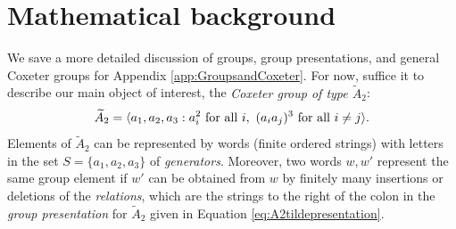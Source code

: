 \documentclass{article}
\begin{document}


\section{Mathematical background}\label{sec:math-background}

We save a more detailed discussion of groups, group presentations, and general Coxeter groups for Appendix \ref{app:GroupsandCoxeter}. For now, suffice it to describe our main object of interest, the \textit{Coxeter group of type $\widetilde{A}_2$}:
\begin{equation}
\label{eq:A2tildepresentation}
\widetilde{A}_2 = \langle a_1, a_2, a_3 : a_i^2 \textup{ for all } i, \,\, (a_ia_j)^3 \textup{ for all } i\neq j\rangle.
\end{equation}
Elements of $\widetilde{A}_2$ can be represented by words (finite ordered strings) with letters in the set $S = \{a_1, a_2, a_3\}$ of {\em generators}. Moreover, two words $w,w'$ represent the same group element if $w'$ can be obtained from $w$ by finitely many insertions or deletions of the {\em relations}, which are the strings to the right of the colon in the {\em group presentation} for $\widetilde{A}_2$ given in  Equation \ref{eq:A2tildepresentation}.
\end{document}
